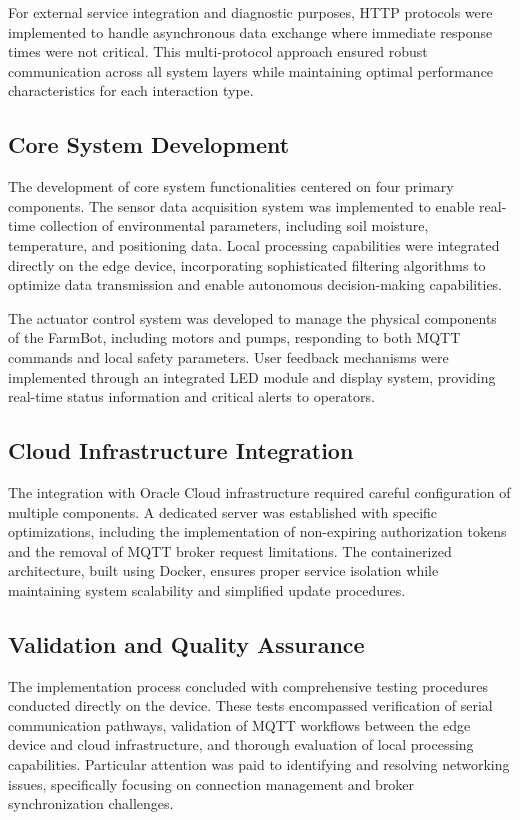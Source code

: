 For external service integration and diagnostic purposes, HTTP protocols were implemented to handle asynchronous data exchange where immediate response times were not critical. This multi-protocol approach ensured robust communication across all system layers while maintaining optimal performance characteristics for each interaction type.

\subsection{Core System Development}
The development of core system functionalities centered on four primary components. The sensor data acquisition system was implemented to enable real-time collection of environmental parameters, including soil moisture, temperature, and positioning data. Local processing capabilities were integrated directly on the edge device, incorporating sophisticated filtering algorithms to optimize data transmission and enable autonomous decision-making capabilities.

The actuator control system was developed to manage the physical components of the FarmBot, including motors and pumps, responding to both MQTT commands and local safety parameters. User feedback mechanisms were implemented through an integrated LED module and display system, providing real-time status information and critical alerts to operators.

\subsection{Cloud Infrastructure Integration}
The integration with Oracle Cloud infrastructure required careful configuration of multiple components. A dedicated server was established with specific optimizations, including the implementation of non-expiring authorization tokens and the removal of MQTT broker request limitations. The containerized architecture, built using Docker, ensures proper service isolation while maintaining system scalability and simplified update procedures.

\subsection{Validation and Quality Assurance}
The implementation process concluded with comprehensive testing procedures conducted directly on the device. These tests encompassed verification of serial communication pathways, validation of MQTT workflows between the edge device and cloud infrastructure, and thorough evaluation of local processing capabilities. Particular attention was paid to identifying and resolving networking issues, specifically focusing on connection management and broker synchronization challenges.

